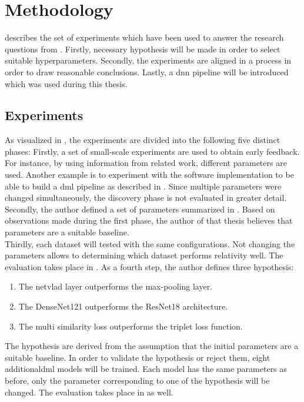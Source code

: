 \chapter{Methodology}
\label{chap:methodology}
 describes the set of experiments which have been used to answer the research questions from . Firstly, necessary hypothesis will be made in order to select suitable hyperparameters. Secondly, the experiments are aligned in a process in order to draw reasonable conclusions. Lastly, a \ac{dnn} pipeline will be introduced which was used during this thesis.
%
\section{Experiments}
\label{sec:experiments}
As visualized in , the experiments are divided into the following five distinct phases: Firstly, a set of small-scale experiments are used to obtain early feedback. For instance, by using information from related work, different parameters are used. Another example is to experiment with the software implementation to be able to build a \ac{dml} pipeline as described in . Since multiple parameters were changed simultaneously, the discovery phase is not evaluated in greater detail. Secondly, the author defined a set of parameters summarized in . Based on observations made during the first phase, the author of that thesis believes that parameters are a suitable baseline.\\
Thirdly, each dataset will tested with the same configurations. Not changing the parameters allows to determining which dataset performs relativity well. The evaluation takes place in . As a fourth step, the author defines three hypothesis:
%
\begin{enumerate}
	\item The \ac{netvlad} layer outperforms the max-pooling layer.
	\item The DenseNet121 outperforms the ResNet18 architecture.
	\item The multi similarity loss outperforms the triplet loss function.
\end{enumerate}
%
The hypothesis are derived from the assumption that the initial parameters are a suitable baseline. In order to validate the hypothesis or reject them, eight additional\ac{dml} models will be trained. Each model has the same parameters as before, only the parameter corresponding to one of the hypothesis will be changed. The evaluation takes place in  as well.\\ 

